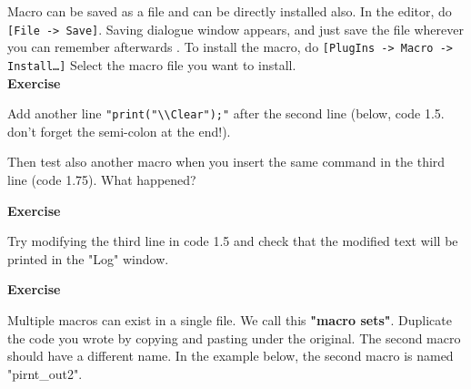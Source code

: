 \documentclass[11pt,a4paper,oneside]{report}
\newenvironment{indentexercise}[1]%
{{\setlength{\leftmargin}{2em}}%
\textbf{Exercise \thesubsection-#1}%
\begin{list}{}%
	\item%
}
{\end{list}}
\newcommand{\ijmenu}[1]{\texttt{\small#1}}
\begin{document}
Macro can be saved as a file and can be directly installed also. In the editor, do \ijmenu{[File -> Save]}. Saving dialogue window appears, and just save the file wherever you can remember afterwards . To install the macro, do \ijmenu{[PlugIns -> Macro -> Install\ldots]} Select the macro file you want to install.\\

\begin{indentexercise}{1}
\item Add another line \texttt{"print("\textbackslash{}\textbackslash{}Clear");"} after the second line (below, code 1.5. don't forget the semi-colon at the end!). 
\item 
Then test also another macro when you insert the same command in the third line (code 1.75). What happened?  
\item 
\end{indentexercise}

\begin{indentexercise}{2}
\item Try modifying the third line in code 1.5 and check that the modified text will be printed in the "Log" window. \\
\end{indentexercise}

\begin{indentexercise}{3}
\item Multiple macros can exist in a single file. We call this \textbf{"macro sets"}. Duplicate the code you wrote by copying and pasting under the original. The second macro should have a different name. In the example below, the second macro is named "pirnt\_out2".
\end{indentexercise}
\end{document}
